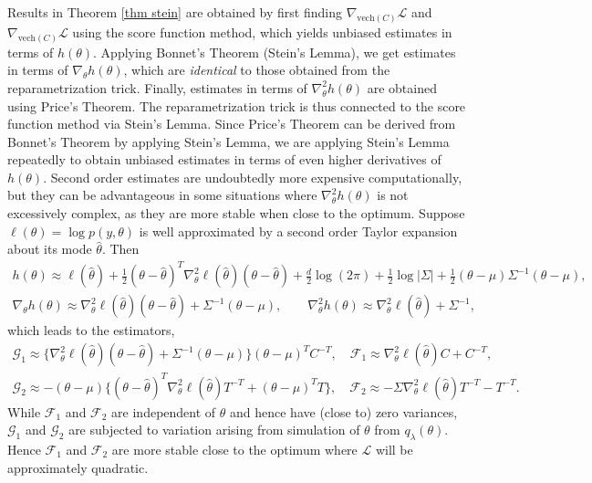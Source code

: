 \documentclass{statsoc}
\newcommand\mL{{\mathcal{L}}}
\newcommand\G{{\mathcal{G}}}
\newcommand\F{{\mathcal{F}}}
\newcommand{\vech}{\text{vech}}
\begin{document}
Results in Theorem \ref{thm stein} are obtained by first finding $\nabla _{\vech(C)} \mL$ and $\nabla _{\vech(C)} \mL$ using the score function method, which yields unbiased estimates in terms of $h(\theta)$. Applying Bonnet's Theorem (Stein's Lemma), we get estimates in terms of $\nabla_\theta h(\theta)$, which are {\em identical} to those obtained from the reparametrization trick. Finally, estimates in terms of $\nabla_\theta^2 h(\theta)$ are obtained using Price's Theorem. The reparametrization trick is thus connected to the score function method via Stein's Lemma. Since Price's Theorem can be derived from Bonnet's Theorem by applying Stein's Lemma, we are applying Stein's Lemma repeatedly to obtain unbiased estimates in terms of even higher derivatives of $h(\theta)$. Second order estimates are undoubtedly more expensive computationally, but they can be advantageous in some situations where $\nabla^2_\theta h(\theta)$ is not excessively complex, as they are more stable when close to the optimum. Suppose $\ell(\theta) = \log p(y, \theta)$ is well approximated by a second order Taylor expansion about its mode $\hat{\theta}$. Then 
\[
\begin{gathered}
h(\theta) \approx \ell(\hat{\theta}) + \tfrac{1}{2} (\theta - \hat{\theta})^T \nabla_{\theta}^2 \ell(\hat{\theta}) (\theta - \hat{\theta}) + \tfrac{d}{2}\log(2\pi) + \tfrac{1}{2}\log|\Sigma| + \tfrac{1}{2}(\theta - \mu) \Sigma^{-1} (\theta - \mu), \\
\nabla_\theta h(\theta) \approx \nabla_{\theta}^2 \ell(\hat{\theta}) (\theta - \hat{\theta})  + \Sigma^{-1} (\theta - \mu),  \qquad 
\nabla_{\theta}^2 h(\theta) \approx \nabla_{\theta}^2 \ell(\hat{\theta}) + \Sigma^{-1},
\end{gathered}
\]
which leads to the estimators,
\[
\begin{gathered}
\G_1 \approx \{\nabla_{\theta}^2 \ell(\hat{\theta}) (\theta - \hat{\theta})   + \Sigma^{-1} (\theta - \mu)\}(\theta-\mu)^T C^{-T}, \quad 
\F_1 \approx \nabla_{\theta}^2 \ell(\hat{\theta})C + C^{-T}, \\
\G_2 \approx - (\theta - \mu) \{ (\theta - \hat{\theta})^T \nabla_{\theta}^2 \ell(\hat{\theta})T^{-T}  +  (\theta - \mu)^T T \} , \quad 
\F_2 \approx - \Sigma\nabla_{\theta}^2 \ell(\hat{\theta})T^{-T} - T^{-T}.
\end{gathered}
\]
While $\F_1$ and $\F_2$ are independent of $\theta$ and hence have (close to) zero variances, $\G_1$ and $\G_2$ are subjected to variation arising from simulation of $\theta$ from $q_\lambda(\theta)$. Hence $\F_1$ and $\F_2$ are more stable close to the optimum where $\mL$ will be approximately quadratic.
\end{document}
